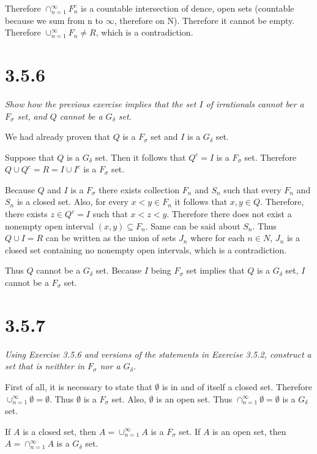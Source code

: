 \documentclass[11pt,oneside,titlepage]{article}
\begin{document}
Therefore $\cap_{n = 1}^{\infty}F_n^c$ is a countable intersection of dence,
open sets (countable because we sum from n to $\infty$, therefore on N).
Therefore it cannot be empty. Therefore $\cup_{n = 1}^{\infty}F_n \neq R$,
which is a contradiction.

\section*{3.5.6}
\textit{Show how the previous exercise implies that the set $I$ of irrationals
  cannot ber a $F_\sigma$ set, and $Q$ cannot be a $G_\delta$ set.}

We had already proven that $Q$ is a $F_\sigma$ set and $I$ is a
$G_\delta$ set. 

Suppose that $Q$ is a $G_\delta$ set. Then it follows that $Q^c = I$ is a
$F_\sigma$ set. Therefore $Q \cup Q^c = R = I \cup I^c$ is a $F_\sigma$ set.

Because $Q$ and $I$ is a $F_\sigma$ there exists collection $F_n$ and $S_n$
such that every $F_n$ and $S_n$ is a closed set. Also, for every
$x < y \in F_n$  it follows that $x, y \in Q$. Therefore, there exists
$z \in Q^c = I$ such that $x < z < y$. Therefore there does not exist
a nonempty open interval $(x, y) \subseteq F_n$. Same can be said
about $S_n$. Thus $Q \cup I = R$ can be written as the union of sets
$J_n$ where for each $n \in N$, $J_n$ is a closed set containing no nonempty
open intervals, which is a contradiction.

Thus $Q$ cannot be a $G_\delta$ set. Because  $I$ being $F_\sigma$ set implies
that $Q$ is a $G_\delta$ set, $I$ cannot be a $F_\sigma$ set.


\section*{3.5.7}
\textit{Using Exercise 3.5.6 and versions of the statements in Exercise 3.5.2,
  construct a set that is neithter in $F_\sigma$ nor a $G_\delta$.}

First of all, it is necessary to state that $\emptyset$ is in and of itself a
closed set. Therefore $\cup_{n = 1}^{\infty} \emptyset = \emptyset$. Thus
$\emptyset$ is a $F_\sigma$ set. Also, $\emptyset$ is an open set. Thus
$\cap_{n = 1}^{\infty} \emptyset = \emptyset$ is a $G_\delta$ set.

If $A$ is a closed set, then $A = \cup_{n = 1}^{\infty} A$ is a $F_\sigma$ set.
If $A$ is an open set, then $A = \cap_{n = 1}^{\infty} A$ is a $G_\delta$ set.
\end{document}

